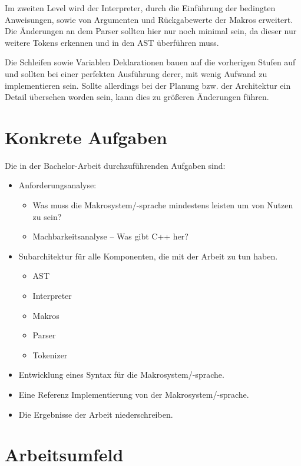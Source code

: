   Im zweiten Level wird der Interpreter, durch die Einführung der bedingten Anweisungen, sowie von Argumenten und Rückgabewerte der Makros erweitert. Die Änderungen an dem Parser sollten hier nur noch minimal sein, da dieser nur weitere Tokens erkennen und in den AST überführen muss.

  Die Schleifen sowie Variablen Deklarationen bauen auf die vorherigen Stufen auf und sollten bei einer perfekten Ausführung derer, mit wenig Aufwand zu implementieren sein. Sollte allerdings bei der Planung bzw. der Architektur ein Detail übersehen worden sein, kann dies zu größeren Änderungen führen.

\section{Konkrete Aufgaben}
\label{sec:konkrete_aufgaben}
  Die in der Bachelor-Arbeit durchzuführenden Aufgaben sind:
  \begin{itemize}
    \item Anforderungsanalyse:
      \begin{itemize}
        \item Was muss die Makrosystem/-sprache mindestens leisten um von Nutzen zu sein?
        \item Machbarkeitsanalyse -- Was gibt C++ her?
      \end{itemize}
    \item Subarchitektur für alle Komponenten, die mit der Arbeit zu tun haben.
      \begin{itemize}
        \item AST
        \item Interpreter
        \item Makros
        \item Parser
        \item Tokenizer
      \end{itemize}
    \item Entwicklung eines Syntax für die Makrosystem/-sprache.
    \item Eine Referenz Implementierung von der Makrosystem/-sprache.
    \item Die Ergebnisse der Arbeit niederschreiben.
  \end{itemize}

\section{Arbeitsumfeld}
\label{sec:arbeitsumfeld}


